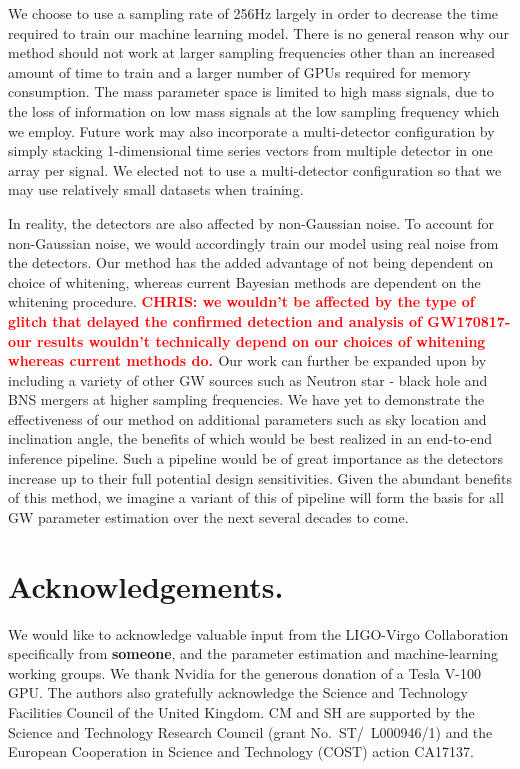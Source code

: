 \documentclass[%
showpacs,
 amsmath,amssymb,
 aps,
 twocolumn,
 prl,
 reprint,
floatfix,
]{revtex4-1}
\newcommand{\chris}[1]{\textbf{\textcolor{red}{CHRIS: #1}}}
\begin{document}
%
%
We choose to use a sampling rate of 256Hz largely in order to 
decrease the time required to train our machine learning model. 
There is no general reason why our method 
should not work at larger sampling frequencies other than an 
increased amount of time to train and a larger 
number of GPUs required for memory consumption. The mass parameter space is limited 
to high mass signals, due to the loss of information on low mass 
signals at the low sampling frequency which we employ. Future work 
may also incorporate a multi-detector configuration by simply stacking 
1-dimensional time series vectors from multiple detector in one array 
per signal. We elected not to use a multi-detector configuration so 
that we may use relatively small datasets when training.

In reality, the detectors are also affected by non-Gaussian noise. 
To account for non-Gaussian noise, we would accordingly train our model using real noise from the detectors. Our method has the added 
advantage of not being dependent on choice of whitening, whereas 
current Bayesian methods are dependent on the whitening procedure.   
\chris{we wouldn't be affected by the type of
glitch that delayed the confirmed detection and analysis of GW170817- our
results wouldn't technically depend on our choices of whitening whereas current
methods do. } Our work can further be expanded upon by including a variety of
other \ac{GW} sources such as Neutron star - black hole and \ac{BNS} mergers at higher
sampling frequencies. We have yet to demonstrate the effectiveness of our method
on additional parameters such as sky location and inclination angle, the
benefits of which would be best realized in an end-to-end inference pipeline.
Such a pipeline would be of great importance as the detectors increase up to
their full potential design sensitivities. Given the abundant 
benefits of this method, we imagine a variant of 
this of pipeline will form the basis for all \ac{GW} parameter 
estimation over the next several decades to come.

%
%
\section{Acknowledgements.}
%
We would like to acknowledge valuable input from the LIGO-Virgo Collaboration
specifically from {\textbf{someone}}, and the parameter estimation and
machine-learning working groups. We thank Nvidia for the generous 
donation of a Tesla V-100 GPU. The authors also gratefully acknowledge the
Science and Technology Facilities Council of the United Kingdom. CM and SH are
supported by the Science and Technology Research Council (grant
No.~ST/~L000946/1) and the European Cooperation in Science and Technology
(COST) action CA17137.
\end{document}
